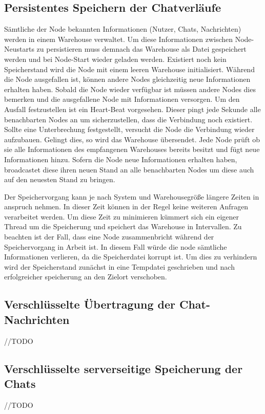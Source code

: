\subsection{Persistentes Speichern der Chatverläufe}
Sämtliche der Node bekannten Informationen (Nutzer, Chats, Nachrichten) werden in einem Warehouse verwaltet. Um diese Informationen zwischen Node-Neustarts zu persistieren muss demnach das Warehouse als Datei gespeichert werden und bei Node-Start wieder geladen werden. Existiert noch kein Speicherstand wird die Node mit einem leeren Warehouse initialisiert. Während die Node ausgefallen ist, können andere Nodes gleichzeitig neue Informationen erhalten haben. Sobald die Node wieder verfügbar ist müssen andere Nodes dies bemerken und die ausgefallene Node mit Informationen versorgen. Um den Ausfall festzustellen ist ein Heart-Beat vorgesehen. Dieser pingt jede Sekunde alle benachbarten Nodes an um sicherzustellen, dass die Verbindung noch existiert. Sollte eine Unterbrechung festgestellt, versucht die Node die Verbindung wieder aufzubauen. Gelingt dies, so wird das Warehouse übersendet. Jede Node prüft ob sie alle Informationen des empfangenen Warehouses bereits besitzt und fügt neue Informationen hinzu. Sofern die Node neue Informationen erhalten haben, broadcastet diese ihren neuen Stand an alle benachbarten Nodes um diese auch auf den neuesten Stand zu bringen.

Der Speichervorgang kann je nach System und Warehousegröße längere Zeiten in anspruch nehmen. In dieser Zeit können in der Regel keine weiteren Anfragen verarbeitet werden. Um diese Zeit zu minimieren kümmert sich ein eigener Thread um die Speicherung und speichert das Warehouse in Intervallen.
Zu beachten ist der Fall, dass eine Node zusammenbricht während der Speichervorgang in Arbeit ist. In diesem Fall würde die node sämtliche Informationen verlieren, da die Speicherdatei korrupt ist. Um dies zu verhindern wird der Speicherstand zunächst in eine Tempdatei geschrieben und nach erfolgreicher speicherung an den Zielort verschoben.

\subsection{Verschlüsselte Übertragung der Chat-Nachrichten}
//TODO

\subsection{Verschlüsselte serverseitige Speicherung der Chats}
//TODO


